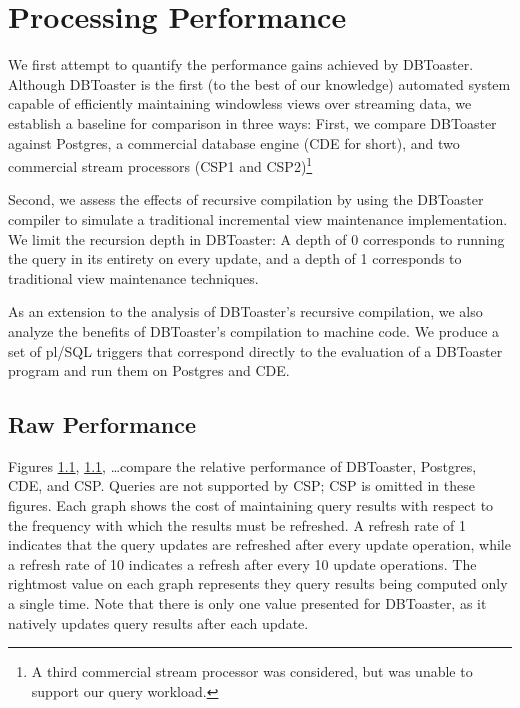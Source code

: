 \section{Processing Performance}
We first attempt to quantify the performance gains achieved by DBToaster.  Although DBToaster is the first (to the best of our knowledge) automated system capable of efficiently maintaining windowless views over streaming data, we establish a baseline for comparison in three ways: First, we compare DBToaster against Postgres, a commercial database engine (CDE for short), and two commercial stream processors (CSP1 and CSP2)\footnote{A third commercial stream processor was considered, but was unable to support our query workload.  }

Second, we assess the effects of recursive compilation by using the DBToaster compiler to simulate a traditional incremental view maintenance implementation.  We limit the recursion depth in DBToaster: A depth of 0 corresponds to running the query in its entirety on every update, and a depth of 1 corresponds to traditional view maintenance techniques.  

As an extension to the analysis of DBToaster's recursive compilation, we also analyze the benefits of DBToaster's compilation to machine code.  We produce a set of pl/SQL triggers that correspond directly to the evaluation of a DBToaster program and run them on Postgres and CDE.

\subsection{Raw Performance}
Figures \ref{}, \ref{}, \ldots compare the relative performance of DBToaster, Postgres, CDE, and CSP.  Queries  are not supported by CSP; CSP is omitted in these figures.  Each graph shows the cost of maintaining query results with respect to the frequency with which the results must be refreshed.  A refresh rate of 1 indicates that the query updates are refreshed after every update operation, while a refresh rate of 10 indicates a refresh after every 10 update operations.  The rightmost value on each graph represents they query results being computed only a single time.  Note that there is only one value presented for DBToaster, as it natively updates query results after each update.


